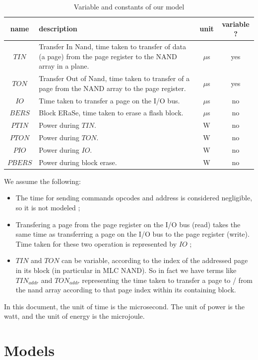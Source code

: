 \documentclass[oneside]{memoir}
\begin{document}
\begin{table}[h!]
\center
\begin{tabular}{| c | p{6cm} | c | c |}
\hline
\textbf{name} & \textbf{description} & \textbf{unit} & \textbf{variable ?}\\
\hline
\hline
$TIN$ & Transfer In Nand, time taken to transfer of data (a page) from the page register to the NAND array in a plane. & $\mu$s & yes\\
\hline
$TON$ & Transfer Out of Nand, time taken to transfer of a page from the NAND array to the page register. & $\mu$s & yes\\
\hline
$IO$ & Time taken to transfer a page on the I/O bus. & $\mu$s & no\\
\hline
$BERS$ & Block ERaSe, time taken to erase a flash block. & $\mu$s & no\\
\hline
$PTIN$ & Power during $TIN$. & W & no\\
\hline
$PTON$ & Power during $TON$. & W & no\\
\hline
$PIO$ & Power during $IO$. & W & no\\
\hline
$PBERS$ & Power during block erase. & W & no\\
\hline
\end{tabular}
\caption{Variable and constants of our model}
\label{table:constvars}
\end{table}

We assume the following:

\begin{itemize}
  \item The time for sending commands opcodes and address is considered negligible, so it is not modeled ;
  \item Transfering a page from the page register on the I/O bus (read) takes the same time as transferring a page on the I/O bus to the page register (write). Time taken for these two operation is represented by $IO$ ;
  \item $TIN$ and $TON$ can be variable, according to the index of the addressed page in its block (in particular in MLC NAND). So in fact we have terms like $TIN_{addr}$ and $TON_{addr}$ representing the time taken to transfer a page to / from the nand array according to that page index within its containing block.
\end{itemize}

In this document, the unit of time is the microsecond. The unit of power is the watt, and the unit of energy is the microjoule.

\section{Models}
\end{document}
